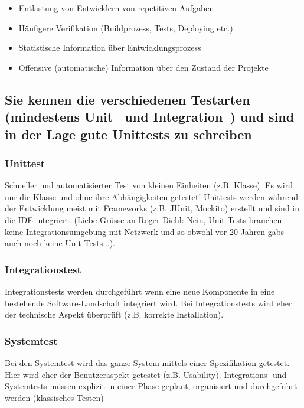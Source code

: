 \begin{itemize}
	\item Entlastung von Entwicklern von repetitiven Aufgaben
	\item Häufigere Verifikation (Buildprozess, Tests, Deploying etc.)
	\item Statistische Information über Entwicklungsprozess
	\item Offensive (automatische) Information über den Zustand der Projekte
\end{itemize}

\subsection{Sie kennen die verschiedenen Testarten (mindestens Unit~ und Integration~) und sind in der Lage gute Unittests zu schreiben}

\subsubsection{Unittest}

Schneller und automatisierter Test von kleinen Einheiten (z.B. Klasse). Es wird nur die Klasse und ohne ihre Abhängigkeiten getestet! Unittests werden während der Entwicklung meist mit Frameworks (z.B. JUnit, Mockito) erstellt und sind in die IDE integriert. (Liebe Grüsse an Roger Diehl: Nein, Unit Tests brauchen keine Integrationsumgebung mit Netzwerk und so obwohl vor 20 Jahren gabs auch noch keine Unit Tests...).

\subsubsection{Integrationstest}

Integrationstests werden durchgeführt wenn eine neue Komponente in eine bestehende Software-Landschaft integriert wird. Bei Integrationstests wird eher der technische Aspekt überprüft (z.B. korrekte Installation).

\subsubsection{Systemtest}

Bei den Systemtest wird das ganze System mittels einer Spezifikation getestet. Hier wird eher der Benutzeraspekt getestet (z.B. Usability). Integrations- und Systemtests müssen explizit in einer Phase geplant, organisiert und durchgeführt werden (klassisches Testen)

